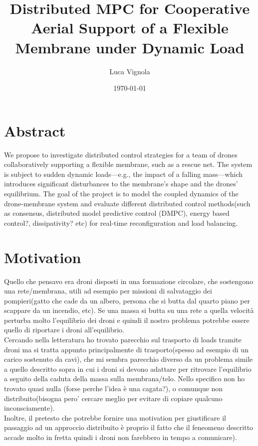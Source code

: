 \documentclass[11pt]{article}
\title{Distributed MPC for Cooperative Aerial Support of a Flexible Membrane under Dynamic Load}
\author{Luca Vignola}
\date{\today}
\begin{document}
\maketitle

\section*{Abstract}

We propose to investigate distributed control strategies for a team of drones collaboratively supporting a flexible membrane, such as a rescue net. The system is subject to sudden dynamic loads—e.g., the impact of a falling mass—which introduces significant disturbances to the membrane's shape and the drones’ equilibrium. The goal of the project is to model the coupled dynamics of the drone-membrane system and evaluate different distributed control methods(such as consensus, distributed model predictive control (DMPC), energy based control?, dissipativity?  etc)  for real-time reconfiguration and load balancing.



\section{Motivation}
Quello che pensavo era droni disposti in una formazione circolare, che sostengono una rete/membrana, utili ad esempio per missioni di salvataggio dei pompieri(gatto che cade da un albero, persona che si butta dal quarto piano per scappare da un incendio, etc). Se una massa si butta su una rete a quella velocità perturba molto l'equilibrio dei droni e quindi il nostro problema potrebbe essere quello di riportare i droni all'equilibrio. \\
Cercando nella letteratura ho trovato parecchio sul trasporto di loads tramite droni ma si tratta appunto principalmente di trasporto(spesso ad esempio di un carico sostenuto da cavi), che mi sembra parecchio diverso da un problema simile a quello descritto sopra in cui i droni si devono adattare per ritrovare l'equilibrio a seguito della caduta della massa sulla membrana/telo. Nello specifico non ho trovato quasi nulla (forse perche l'idea è una cagata?), o comunque non distribuito(bisogna pero' cercare meglio per evitare di copiare qualcuno inconsciamente). \\
 Inoltre, il pretesto che potrebbe fornire una motivation per giustificare il passaggio ad un approccio distribuito è proprio il fatto che il feneomeno descritto accade molto in fretta quindi i droni non farebbero in tempo a comunicare).
\end{document}

